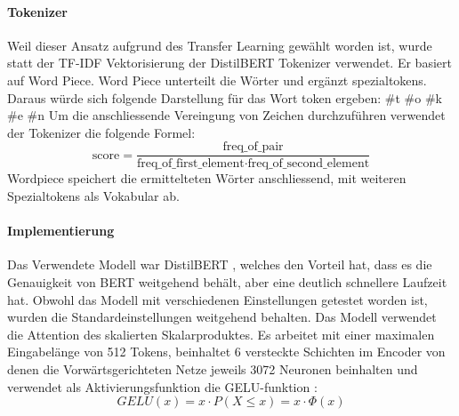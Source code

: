 \paragraph{Tokenizer}
Weil dieser Ansatz aufgrund des Transfer Learning gewählt worden ist, wurde statt der TF-IDF Vektorisierung der DistilBERT Tokenizer verwendet. Er basiert auf Word Piece. Word Piece unterteilt die Wörter und ergänzt spezialtokens. Daraus würde sich folgende Darstellung für das Wort token ergeben: \#t \#o \#k \#e \#n
Um die anschliessende Vereingung von Zeichen durchzuführen verwendet der Tokenizer die folgende Formel:
$$
    \text{score} = \frac{\text{freq\_of\_pair}}{\text{freq\_of\_first\_element} \cdot \text{freq\_of\_second\_element}}
$$
Wordpiece speichert die ermittelteten Wörter anschliessend, mit weiteren Spezialtokens als Vokabular ab.

\paragraph{Implementierung}
Das Verwendete Modell war DistilBERT \cite{Sanh2019}, welches den Vorteil hat, dass es die Genauigkeit von BERT weitgehend behält, aber eine deutlich schnellere Laufzeit hat. Obwohl das Modell mit verschiedenen Einstellungen getestet worden ist, wurden die Standardeinstellungen weitgehend behalten. Das Modell verwendet die Attention des skalierten Skalarproduktes. Es arbeitet mit einer maximalen Eingabelänge von 512 Tokens, beinhaltet 6 versteckte Schichten im Encoder von denen die Vorwärtsgerichteten Netze jeweils 3072 Neuronen beinhalten und verwendet als Aktivierungsfunktion die GELU-funktion \cite{Hendrycks2016}:
$$GELU(x) = x \cdot P(X \leq x) = x \cdot \Phi(x) $$
